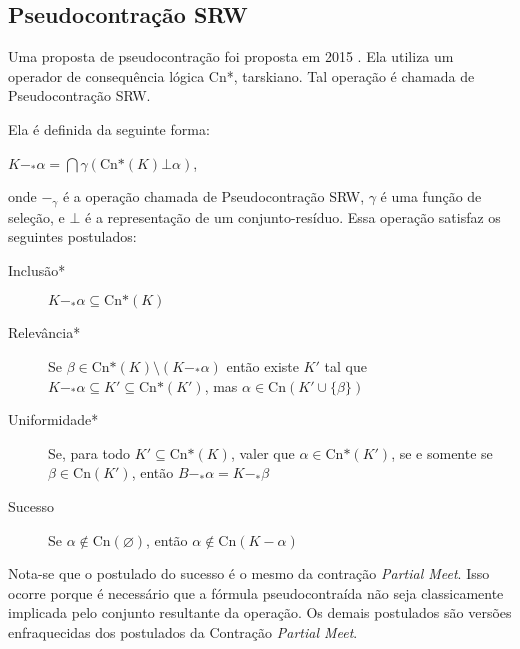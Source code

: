 \subsection{Pseudocontração SRW}

Uma proposta de pseudocontração foi proposta em 2015 \citep{revisaoSantos}. Ela utiliza um operador de consequência lógica Cn*, tarskiano. Tal operação é chamada de Pseudocontração SRW. 

Ela é definida da seguinte forma:

\begin{center}
	$ K -_* \alpha = \bigcap \gamma(\text{Cn*}(K) \bot \alpha) $,
\end{center}

onde $ -_{\gamma} $ é a operação chamada de Pseudocontração SRW, $ \gamma $ é uma função de seleção, e $ \bot $ é a representação de um conjunto-resíduo. Essa operação satisfaz os seguintes postulados:

\begin{description}
	\item[Inclusão*] $ K -_* \alpha \subseteq \text{Cn*}(K)$
	\item[Relevância*] Se $ \beta \in \text{Cn*}(K) \setminus (K -_* \alpha) $ então existe  $ K' $ tal que $ K -_* \alpha \subseteq K' \subseteq \text{Cn*}(K') $, mas $ \alpha \in \text{Cn}(K' \cup \{\beta\}) $
	\item[Uniformidade*] Se, para todo $K' \subseteq \text{Cn*}(K) $, valer que $ \alpha \in \text{Cn*}(K') $, se e somente se $ \beta \in \text{Cn}(K') $, então $ B -_* \alpha = K -_* \beta $
	\item[Sucesso] Se $ \alpha \notin \text{Cn}(\varnothing) $, então $ \alpha \notin \text{Cn}(K - \alpha) $
\end{description}

Nota-se que o postulado do sucesso é o mesmo da contração \textit{Partial Meet}. Isso ocorre porque é necessário que a fórmula pseudocontraída não seja classicamente implicada pelo conjunto resultante da operação. Os demais postulados são versões enfraquecidas dos postulados da Contração \textit{Partial Meet}.
